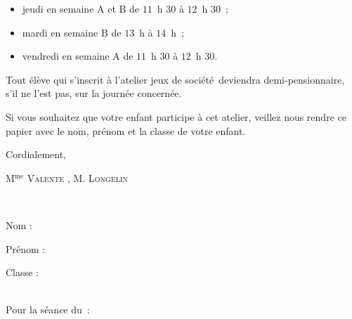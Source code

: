 \documentclass{article}
\def\atelier{jeux de société}
\begin{document}
    \begin{itemize}[label=-]
        \item jeudi en semaine A et B de $11$~h $30$ à $12$~h $30$~;
        \item mardi en semaine B de $13$~h à $14$~h~;
        \item vendredi en semaine A de $11$~h $30$ à $12$~h $30$.
    \end{itemize} \par
    Tout élève qui s'inscrit à l'atelier \atelier \, deviendra demi-pensionnaire, s'il ne l'est pas, sur la journée concernée.
%
    \par \vfill
    Si vous souhaitez que votre enfant participe à cet atelier, veillez nous rendre ce papier avec le nom, prénom et la classe de votre enfant. \par \vfill
    Cordialement, 
    \par \medskip 
    M$^\text{me}$ \textsc{Valente}%
    , M. \textsc{Longelin}%
    \par \vfill \hrulefill ~\par \vfill \noindent 
    \begin{minipage}[t]{.4\linewidth} 
        Nom : \dotuline{ \TextField[name=nom,bordercolor=White,height=0.5cm,width=0.8\linewidth,align=0]{}        
        } 
    \end{minipage}\hfill
    \begin{minipage}[t]{.4\linewidth}
        Prénom : \dotuline{ \TextField[name=prenom,bordercolor=White,height=0.5cm,width=0.72\linewidth,align=0]{}
        }
    \end{minipage}\hfill
    \begin{minipage}[t]{.2\linewidth}
        Classe : \dotuline{ \TextField[name=classe,bordercolor=White,height=0.5cm,width=0.6\linewidth,align=0]{}
        } 
    \end{minipage}~\\ \vfill
    \noindent Pour la séance du~: \hfill
    \begin{minipage}[t]{.15\linewidth}
    \end{minipage}\hfill
    \begin{minipage}[t]{.15\linewidth}
    \end{minipage}\hfill
\end{document}
